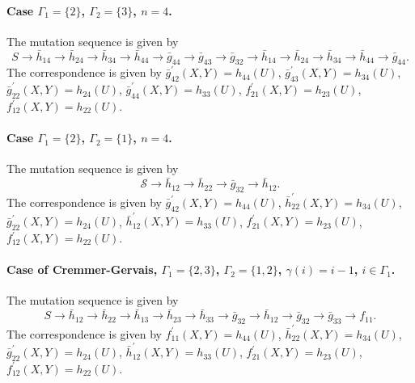 \paragraph{Case $\Gamma_1 = \{2\}$, $\Gamma_2 = \{3\}$, $n=4$.} The mutation sequence is given by
\begin{equation}
    S \rightarrow \bar{h}_{14} \rightarrow \bar{h}_{24} \rightarrow \bar{h}_{34} \rightarrow \bar{h}_{44} \rightarrow \bar{g}_{44} \rightarrow \bar{g}_{43}  \rightarrow \bar{g}_{32} \rightarrow  \bar{h}_{14} \rightarrow \bar{h}_{24} \rightarrow \bar{h}_{34} \rightarrow \bar{h}_{44} \rightarrow \bar{g}_{44}.
\end{equation}
The correspondence is given by $\bar{g}_{42}^{\prime}(X,Y) = h_{44}(U)$, $\bar{g}_{43}^{\prime}(X,Y) = h_{34}(U)$, $\bar{g}_{22}^{\prime}(X,Y) = h_{24}(U)$, $\bar{g}_{44}^{\prime}(X,Y) = h_{33}(U)$, $f_{21}^{\prime}(X,Y) = h_{23}(U)$, $f_{12}^{\prime}(X,Y) = h_{22}(U)$.

\paragraph{Case $\Gamma_1 = \{2\}$, $\Gamma_2 = \{1\}$, $n=4$.} The mutation sequence is given by
\begin{equation}
    \mathcal{S}\rightarrow \bar{h}_{12}\rightarrow \bar{h}_{22}\rightarrow \bar{g}_{32}\rightarrow \bar{h}_{12}.
\end{equation}
The correspondence is given by $\bar{g}_{42}^{\prime}(X,Y) = h_{44}(U)$, $\bar{h}_{22}^{\prime}(X,Y) = h_{34}(U)$, $\bar{g}_{22}^{\prime}(X,Y) = h_{24}(U)$, $\bar{h}_{12}^{\prime}(X,Y) = h_{33}(U)$, $f_{21}^{\prime}(X,Y) = h_{23}(U)$, $f_{12}^{\prime}(X,Y) = h_{22}(U)$.

\paragraph{Case of Cremmer-Gervais, $\Gamma_1= \{2,3\}$, $\Gamma_2 = \{1,2\}$, $\gamma(i) = i-1$, $i \in \Gamma_1$.} The mutation sequence is given by
\begin{equation}
    S \rightarrow \bar{h}_{12} \rightarrow \bar{h}_{22} \rightarrow \bar{h}_{13} \rightarrow \bar{h}_{23} \rightarrow \bar{h}_{33} \rightarrow \bar{g}_{32} \rightarrow \bar{h}_{12} \rightarrow \bar{g}_{32} \rightarrow \bar{g}_{33} \rightarrow f_{11}.
\end{equation}
The correspondence is given by $f_{11}^{\prime}(X,Y) = h_{44}(U)$, $\bar{h}_{22}^{\prime}(X,Y) = h_{34}(U)$, $\bar{g}_{22}^{\prime}(X,Y) = h_{24}(U)$, $\bar{h}_{12}^{\prime}(X,Y) = h_{33}(U)$, $f_{21}^{\prime}(X,Y) = h_{23}(U)$, $f_{12}^{\prime}(X,Y) = h_{22}(U)$.

